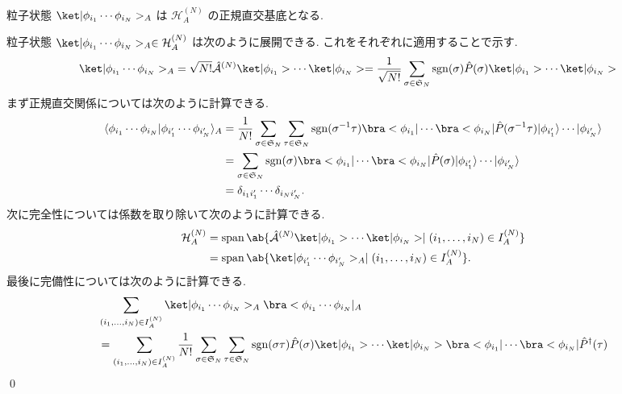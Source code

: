 \documentclass[uplatex,dvipdfmx,a4paper,11pt]{jlreq}
\makeatletter
\DeclareMathOperator{\sgn}{sgn}
\DeclareMathOperator{\Span}{span}
\newcommand{\HH}{\mathcal{H}}
\renewcommand{\SS}{\mathfrak{S}}
\newcommand{\A}{\mathcal{A}}
\numberwithin{equation}{section}
\theoremstyle{definition}
\renewenvironment{proof}[1][\proofname]{\par
  \normalfont
  \topsep6\p@\@plus6\p@ \trivlist
  \item[\hskip\labelsep{\bfseries #1}\@addpunct{\bfseries}]\ignorespaces\quad\par
}{%
  \qed\endtrivlist\@endpefalse
}
\renewcommand\proofname{証明}
\makeatother
\begin{document}
\begin{proposition}[Q21-21(iii)(iv)(v)]
  粒子状態 $\ket|\phi_{i_1}\cdots\phi_{i_N}>_A$ は $\HH_A^{(N)}$ の正規直交基底となる.
\end{proposition}
\begin{proof}
  粒子状態 $\ket|\phi_{i_1}\cdots\phi_{i_N}>_A\in\HH_A^{(N)}$ は次のように展開できる. これをそれぞれに適用することで示す.
  \begin{align}
    \ket|\phi_{i_1}\cdots\phi_{i_N}>_A & = \sqrt{N!}\hat{\A}^{(N)}\ket|\phi_{i_1}>\cdots\ket|\phi_{i_N}> = \frac{1}{\sqrt{N!}}\sum_{\sigma\in\SS_N}\sgn(\sigma)\hat{P}(\sigma)\ket|\phi_{i_1}>\cdots\ket|\phi_{i_N}>
  \end{align}
  まず正規直交関係については次のように計算できる.
  \begin{align}
    \langle\phi_{i_1}\cdots\phi_{i_N}|\phi_{i_1'}\cdots\phi_{i_N'}\rangle_A & = \frac{1}{N!}\sum_{\sigma\in\SS_N}\sum_{\tau\in\SS_N}\sgn(\sigma^{-1}\tau)\bra<\phi_{i_1}|\cdots\bra<\phi_{i_N}|\hat{P}(\sigma^{-1}\tau)|\phi_{i_1'}\rangle\cdots|\phi_{i_N'}\rangle \\
                                                                            & = \sum_{\sigma\in\SS_N}\sgn(\sigma)\bra<\phi_{i_1}|\cdots\bra<\phi_{i_N}|\hat{P}(\sigma)|\phi_{i_1'}\rangle\cdots|\phi_{i_N'}\rangle                                                  \\
                                                                            & = \delta_{i_1i_1'}\cdots\delta_{i_Ni_N'}.
  \end{align}
  次に完全性については係数を取り除いて次のように計算できる.
  \begin{align}
    \HH_A^{(N)} & = \Span\ab\{\hat{\A}^{(N)}\ket|\phi_{i_1}>\cdots\ket|\phi_{i_N}> \mid (i_1,\ldots,i_N)\in I_A^{(N)} \} \\
                & = \Span\ab\{\ket|\phi_{i_1'}\cdots\phi_{i_N'}>_A \mid (i_1,\ldots,i_N)\in I_A^{(N)} \}.
  \end{align}
  最後に完備性については次のように計算できる.
  \begin{align}
     & \sum_{(i_1,\ldots,i_N)\in I_A^{(N)}}\ket|\phi_{i_1}\cdots\phi_{i_N}>_A\bra<\phi_{i_1}\cdots\phi_{i_N}|_A                                                                                                                   \\
     & = \sum_{(i_1,\ldots,i_N)\in I_A^{(N)}}\frac{1}{N!}\sum_{\sigma\in\SS_N}\sum_{\tau\in\SS_N}\sgn(\sigma\tau)\hat{P}(\sigma)\ket|\phi_{i_1}>\cdots\ket|\phi_{i_N}>\bra<\phi_{i_1}|\cdots\bra<\phi_{i_N}|\hat{P}^\dagger(\tau) \\

\end{align}
\end{proof}
\end{document}
